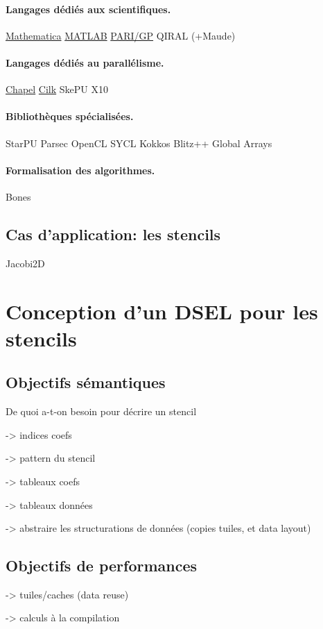 \paragraph{Langages dédiés aux scientifiques.}

\textsf{\href{http://www.wolfram.com/mathematica/}{Mathematica}}
\textsf{\href{http://fr.mathworks.com/}{MATLAB}}
\textsf{\href{http://pari.math.u-bordeaux.fr/}{PARI/GP}}
\textsf{QIRAL} (+\textsf{Maude})



\paragraph{Langages dédiés au parallélisme.}
\textsf{\href{http://chapel.cray.com/}{Chapel}}
\textsf{\href{https://www.cilkplus.org/}{Cilk}}
\textsf{SkePU}
\textsf{X10}

\paragraph{Bibliothèques spécialisées.}
\textsf{StarPU}
\textsf{Parsec}
\textsf{OpenCL}
\textsf{SYCL}
\textsf{Kokkos}
\textsf{Blitz++}
\textsf{Global Arrays}

\paragraph{Formalisation des algorithmes.}
\textsf{Bones}

\subsection{Cas d'application: les stencils}

Jacobi2D

\section{Conception d'un DSEL pour les stencils}

\subsection{Objectifs sémantiques}

De quoi a-t-on besoin pour décrire un stencil

-> indices coefs

-> pattern du stencil

-> tableaux coefs

-> tableaux données

-> abstraire les structurations de données (copies tuiles, et data layout)

\subsection{Objectifs de performances}

-> tuiles/caches (data reuse)

-> calculs à la compilation

